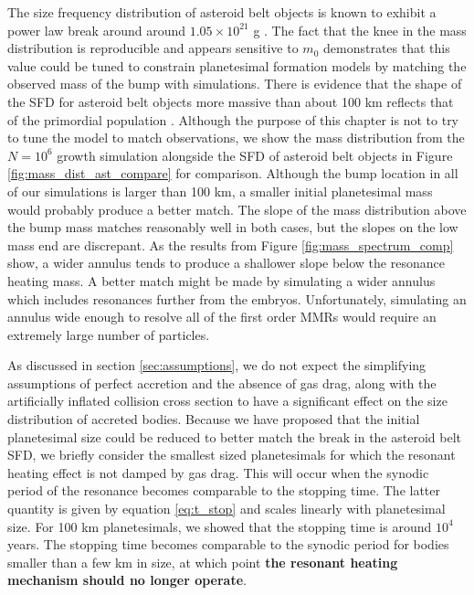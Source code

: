 The size frequency distribution of asteroid belt objects is known to exhibit a power law break around around 
$1.05 \times 10^{21}$ g \cite{jedicke02}. The fact that the knee in the mass distribution is reproducible and appears sensitive to 
$m_{0}$ demonstrates that this value could be tuned to constrain planetesimal formation models by matching the observed 
mass of the bump with simulations. There is evidence that the shape of the SFD for asteroid belt objects more massive than 
about 100 km reflects that of the primordial population \cite{morbidelli09}. Although the purpose of this chapter is not to try to tune 
the model to match observations, we show the mass distribution from the $N=10^6$ growth simulation alongside the SFD of 
asteroid belt objects \cite{bottke05} in Figure \ref{fig:mass_dist_ast_compare} for comparison. Although the bump location in all 
of our simulations is larger than 100 km, a smaller initial planetesimal mass would probably produce a better match. The slope of 
the mass distribution above the bump mass matches reasonably well in both cases, but the slopes on the low mass end are 
discrepant. As the results from Figure \ref{fig:mass_spectrum_comp} show, a wider annulus tends to produce a shallower slope 
below the resonance heating mass. A better match might be made by simulating a wider annulus which includes resonances 
further from the embryos. Unfortunately, simulating an annulus wide enough to resolve all of the first order MMRs would require 
an extremely large number of particles.

As discussed in section \ref{sec:assumptions}, we do not expect the simplifying assumptions of perfect accretion and the 
absence of gas drag, along with the artificially inflated collision cross section to have a significant effect on the size distribution of 
accreted bodies. Because we have proposed that the initial planetesimal size could be reduced to better match the break in the 
asteroid belt SFD, we briefly consider the smallest sized planetesimals for which the resonant heating effect is not damped by 
gas drag. This will occur when the synodic period of the resonance becomes comparable to the stopping time. The latter quantity 
is given by equation \ref{eq:t_stop} and scales linearly with planetesimal size. For 100 km planetesimals, we showed that the 
stopping time is around $10^4$ years. The stopping time becomes comparable to the synodic period for bodies smaller than a 
few km in size, at which point \textbf{the resonant heating mechanism should no longer operate}.

